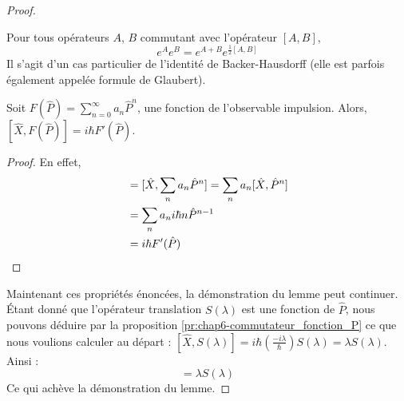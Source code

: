\documentclass[../notesdecours]{subfiles}
\begin{document}
\begin{proof}
    \begin{proposition}
        Pour tous opérateurs $A$, $B$ commutant avec l'opérateur $[A,B]$, 
    	\begin{equation}
            e^A e^B = e^{A+B}e^{\frac{1}{2} [A,B]}
    	\end{equation}
        Il s'agit d'un cas particulier de l'identité de Backer-Hausdorff (elle est parfois également appelée formule de Glaubert).
    \end{proposition}

    \begin{proposition} \label{pr:chap6-commutateur_fonction_P}
        Soit $F(\hat{P}) = \sum_{n=0}^\infty a_n \hat{P}^n$, une fonction de l'observable impulsion. Alors, $[\hat{X}, F(\hat{P})] = i\hbar F'(\hat{P})$.

        \begin{proof}
            En effet, \begin{align}
                [\hat{X}, F(\hat{P})] &= [\hat{X}, \sum_n a_n \hat{P}^n] = \sum_n a_n[\hat{X}, \hat{P}^n] \notag \\
                &= \sum_n a_n i\hbar n \hat{P}^{n-1} \notag \\
                &= i\hbar F'(\hat{P}) \notag
            \end{align}
        \end{proof}
    \end{proposition}

    Maintenant ces propriétés énoncées, la démonstration du lemme peut continuer.\\


    \'Etant donné que l'opérateur translation $S(\lambda)$ est une fonction de $\hat{P}$, nous pouvons déduire par la proposition \ref{pr:chap6-commutateur_fonction_P} ce que nous voulions calculer au départ : 
    $[\hat{X}, S(\lambda)] = i\hbar \left( \frac{-i \lambda}{\hbar} \right) S(\lambda) = \lambda S(\lambda)$. \\
    Ainsi :
    \begin{equation}
        [\hat{X}, S(\lambda)] =\lambda S(\lambda)
        \label{commutateur de S}
    \end{equation}
    Ce qui achève la démonstration du lemme.
\end{proof}
\end{document}
